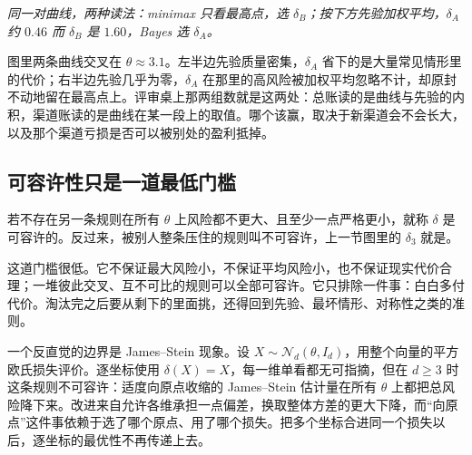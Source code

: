 \begin{center}

\emph{同一对曲线，两种读法：minimax 只看最高点，选 \(\delta_B\)；按下方先验加权平均，\(\delta_A\) 约 \(0.46\) 而 \(\delta_B\) 是 \(1.60\)，Bayes 选 \(\delta_A\)。}
\end{center}

图里两条曲线交叉在 \(\theta\approx 3.1\)。左半边先验质量密集，\(\delta_A\) 省下的是大量常见情形里的代价；右半边先验几乎为零，\(\delta_A\) 在那里的高风险被加权平均忽略不计，却原封不动地留在最高点上。评审桌上那两组数就是这两处：总账读的是曲线与先验的内积，渠道账读的是曲线在某一段上的取值。哪个该赢，取决于新渠道会不会长大，以及那个渠道亏损是否可以被别处的盈利抵掉。

\subsection{可容许性只是一道最低门槛}

若不存在另一条规则在所有 \(\theta\) 上风险都不更大、且至少一点严格更小，就称 \(\delta\) 是可容许的。反过来，被别人整条压住的规则叫不可容许，上一节图里的 \(\delta_3\) 就是。

这道门槛很低。它不保证最大风险小，不保证平均风险小，也不保证现实代价合理；一堆彼此交叉、互不可比的规则可以全部可容许。它只排除一件事：白白多付代价。淘汰完之后要从剩下的里面挑，还得回到先验、最坏情形、对称性之类的准则。

一个反直觉的边界是 James--Stein 现象。设 \(X\sim\mathcal N_d(\theta,I_d)\)，用整个向量的平方欧氏损失评价。逐坐标使用 \(\delta(X)=X\)，每一维单看都无可指摘，但在 \(d\ge 3\) 时这条规则不可容许：适度向原点收缩的 James--Stein 估计量在所有 \(\theta\) 上都把总风险降下来。改进来自允许各维承担一点偏差，换取整体方差的更大下降，而``向原点''这件事依赖于选了哪个原点、用了哪个损失。把多个坐标合进同一个损失以后，逐坐标的最优性不再传递上去。

